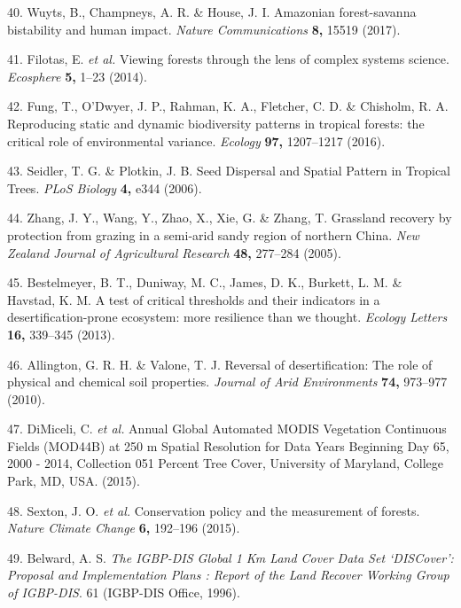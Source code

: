 \documentclass[]{article}
\begin{document}
\hypertarget{ref-Wuyts2017}{}
40. Wuyts, B., Champneys, A. R. \& House, J. I. Amazonian forest-savanna
bistability and human impact. \emph{Nature Communications} \textbf{8,}
15519 (2017).

\hypertarget{ref-Filotas2014}{}
41. Filotas, E. \emph{et al.} Viewing forests through the lens of
complex systems science. \emph{Ecosphere} \textbf{5,} 1--23 (2014).

\hypertarget{ref-Fung2016}{}
42. Fung, T., O'Dwyer, J. P., Rahman, K. A., Fletcher, C. D. \&
Chisholm, R. A. Reproducing static and dynamic biodiversity patterns in
tropical forests: the critical role of environmental variance.
\emph{Ecology} \textbf{97,} 1207--1217 (2016).

\hypertarget{ref-Seidler2006}{}
43. Seidler, T. G. \& Plotkin, J. B. Seed Dispersal and Spatial Pattern
in Tropical Trees. \emph{PLoS Biology} \textbf{4,} e344 (2006).

\hypertarget{ref-Zhang2005}{}
44. Zhang, J. Y., Wang, Y., Zhao, X., Xie, G. \& Zhang, T. Grassland
recovery by protection from grazing in a semi‐arid sandy region of
northern China. \emph{New Zealand Journal of Agricultural Research}
\textbf{48,} 277--284 (2005).

\hypertarget{ref-Bestelmeyer2013}{}
45. Bestelmeyer, B. T., Duniway, M. C., James, D. K., Burkett, L. M. \&
Havstad, K. M. A test of critical thresholds and their indicators in a
desertification-prone ecosystem: more resilience than we thought.
\emph{Ecology Letters} \textbf{16,} 339--345 (2013).

\hypertarget{ref-Allington2010}{}
46. Allington, G. R. H. \& Valone, T. J. Reversal of desertification:
The role of physical and chemical soil properties. \emph{Journal of Arid
Environments} \textbf{74,} 973--977 (2010).

\hypertarget{ref-DiMiceli2015}{}
47. DiMiceli, C. \emph{et al.} Annual Global Automated MODIS Vegetation
Continuous Fields (MOD44B) at 250 m Spatial Resolution for Data Years
Beginning Day 65, 2000 - 2014, Collection 051 Percent Tree Cover,
University of Maryland, College Park, MD, USA. (2015).

\hypertarget{ref-Sexton2015}{}
48. Sexton, J. O. \emph{et al.} Conservation policy and the measurement
of forests. \emph{Nature Climate Change} \textbf{6,} 192--196 (2015).

\hypertarget{ref-Belward1996}{}
49. Belward, A. S. \emph{The IGBP-DIS Global 1 Km Land Cover Data Set
`DISCover': Proposal and Implementation Plans : Report of the Land
Recover Working Group of IGBP-DIS}. 61 (IGBP-DIS Office, 1996).
\end{document}
